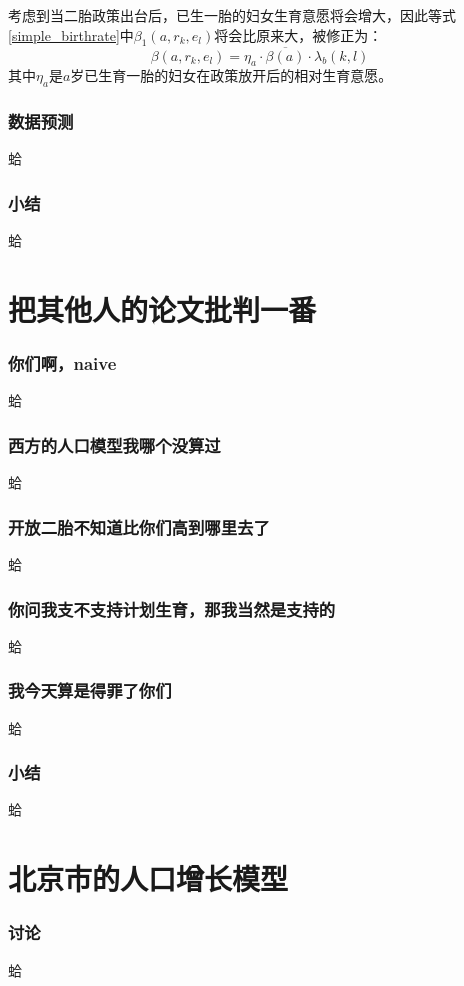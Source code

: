 \documentclass[11pt]{article}
\begin{document}
考虑到当二胎政策出台后，已生一胎的妇女生育意愿将会增大，因此等式\ref{simple_birthrate}中$\beta_1(a, r_k, e_l)$将会比原来大，被修正为：
	\begin{equation}
		\label{amend_birthrate_policydown}
		\beta(a, r_k, e_l) = \eta_a \cdot \overline{\beta(a)} \cdot \lambda_b(k,l)
	\end{equation}
其中$\eta_a$是$a$岁已生育一胎的妇女在政策放开后的相对生育意愿。

\section{数据预测}
	蛤
\section{小结}
	蛤
	
\part{把其他人的论文批判一番}
	\section{你们啊，naive}
		蛤
	\section{西方的人口模型我哪个没算过}
		蛤
	\section{开放二胎不知道比你们高到哪里去了}
		蛤
	\section{你问我支不支持计划生育，那我当然是支持的}
		蛤
	\section{我今天算是得罪了你们}
		蛤
	\section{小结}
		蛤
	
\part{北京市的人口增长模型}
	\section{讨论}
		蛤
\end{document}

